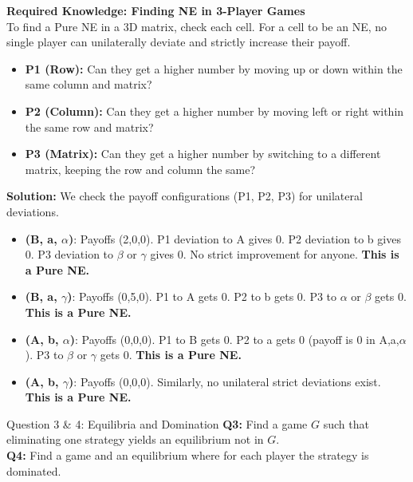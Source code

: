 \documentclass[12pt, a4paper]{article}
\begin{document}
\begin{notebox}
\textbf{Required Knowledge: Finding NE in 3-Player Games} \\
To find a Pure NE in a 3D matrix, check each cell. For a cell to be an NE, no single player can unilaterally deviate and strictly increase their payoff. 
\begin{itemize}
    \item \textbf{P1 (Row):} Can they get a higher number by moving up or down within the same column and matrix?
    \item \textbf{P2 (Column):} Can they get a higher number by moving left or right within the same row and matrix?
    \item \textbf{P3 (Matrix):} Can they get a higher number by switching to a different matrix, keeping the row and column the same?
\end{itemize}
\end{notebox}

\textbf{Solution:} We check the payoff configurations (P1, P2, P3) for unilateral deviations.
\begin{itemize}
    \item \textbf{(B, a, $\alpha$)}: Payoffs (2,0,0). P1 deviation to A gives 0. P2 deviation to b gives 0. P3 deviation to $\beta$ or $\gamma$ gives 0. No strict improvement for anyone. \textbf{This is a Pure NE.}
    \item \textbf{(B, a, $\gamma$)}: Payoffs (0,5,0). P1 to A gets 0. P2 to b gets 0. P3 to $\alpha$ or $\beta$ gets 0. \textbf{This is a Pure NE.}
    \item \textbf{(A, b, $\alpha$)}: Payoffs (0,0,0). P1 to B gets 0. P2 to a gets 0 (payoff is 0 in A,a,$\alpha$). P3 to $\beta$ or $\gamma$ gets 0. \textbf{This is a Pure NE.}
    \item \textbf{(A, b, $\gamma$)}: Payoffs (0,0,0). Similarly, no unilateral strict deviations exist. \textbf{This is a Pure NE.}
\end{itemize}

\vspace{0.5cm}
\begin{exbox}{Question 3 \& 4: Equilibria and Domination}
\textbf{Q3:} Find a game $G$ such that eliminating one strategy yields an equilibrium not in $G$. \\
\textbf{Q4:} Find a game and an equilibrium where for each player the strategy is dominated.
\end{exbox}
\end{document}
